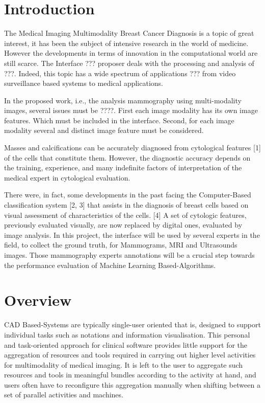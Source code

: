 \begin{titlepage}

\vfill %

\end{titlepage}

\section{Introduction}

The Medical Imaging Multimodality Breast Cancer Diagnosis is a topic of great interest, it has been the subject of intensive research in the world of medicine. However the developments in terms of innovation in the computational world are still scarce. The Interface ??? proposer deals with the processing and analysis of ???. Indeed, this topic has a wide spectrum of applications ??? from video surveillance based systems to medical applications.

In the proposed work, i.e., the analysis mammography using multi-modality images, several issues must be ????. First each image modality has its own image features. Which must be included in the interface. Second, for each image modality several and distinct image feature must be considered.

Masses and calcifications can be accurately diagnosed from cytological features [1] of the cells that constitute them. However, the diagnostic accuracy depends on the training, experience, and many indefinite factors of interpretation of the medical expert in cytological evaluation.

There were, in fact, some developments in the past facing the Computer-Based classification system [2, 3] that assists in the diagnosis of breast cells based on visual assessment of characteristics of the cells. [4] A set of cytologic features, previously evaluated visually, are now replaced by digital ones, evaluated by image analysis. In this project, the interface will be used by several experts in the field, to collect the ground truth, for Mammograms, MRI and Ultrasounds images. Those mammography experts annotations will be a crucial step towards the performance evaluation of Machine Learning Based-Algorithms.

\section{Overview}

CAD Based-Systems are typically single-user oriented that is, designed to support individual tasks such as notations and information visualisation. This personal and task-oriented approach for clinical software provides little support for the aggregation of resources and tools required in carrying out higher level activities for multimodality of medical imaging. It is left to the user to aggregate such resources and tools in meaningful bundles according to the activity at hand, and users often have to reconfigure this aggregation manually when shifting between a set of parallel activities and machines.


